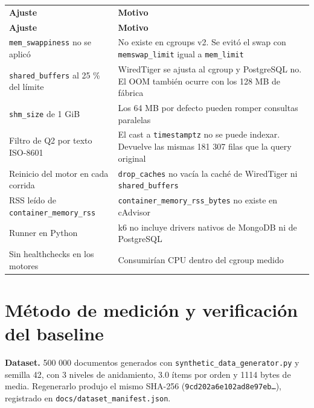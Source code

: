 \documentclass[11pt,letterpaper]{article}
\newcommand{\code}[1]{\texttt{#1}}
\begin{document}
{\footnotesize\setlength{\tabcolsep}{3pt}
\begin{longtable}{>{\raggedright\arraybackslash}p{}>{\raggedright\arraybackslash}p{}}
\multicolumn{2}{@{}l}{\normalsize \textbf{Ajustes respecto al playbook:}} \\[0.4em]
\toprule
\textbf{Ajuste} & \textbf{Motivo} \\
\midrule
\endfirsthead
\toprule
\textbf{Ajuste} & \textbf{Motivo} \\
\midrule
\endhead
\code{mem\_\allowbreak{}swappiness} no se aplicó & No existe en cgroups v2. Se evitó el swap con \code{memswap\_\allowbreak{}limit} igual a \code{mem\_\allowbreak{}limit} \\
\code{shared\_\allowbreak{}buffers} al 25 \% del límite & WiredTiger se ajusta al cgroup y PostgreSQL no. El OOM también ocurre con los 128 MB de fábrica \\
\code{shm\_\allowbreak{}size} de 1 GiB & Los 64 MB por defecto pueden romper consultas paralelas \\
Filtro de Q2 por texto ISO-8601 & El cast a \code{timestamptz} no se puede indexar. Devuelve las mismas 181 307 filas que la query original \\
Reinicio del motor en cada corrida & \code{drop\_\allowbreak{}caches} no vacía la caché de WiredTiger ni \code{shared\_\allowbreak{}buffers} \\
RSS leído de \code{container\_\allowbreak{}memory\_\allowbreak{}rss} & \code{container\_\allowbreak{}memory\_\allowbreak{}rss\_\allowbreak{}bytes} no existe en cAdvisor \\
Runner en Python & k6 no incluye drivers nativos de MongoDB ni de PostgreSQL \\
Sin healthchecks en los motores & Consumirían CPU dentro del cgroup medido \\
\bottomrule
\end{longtable}}

\section{Método de medición y verificación del baseline}

\textbf{Dataset.} 500 000 documentos generados con \code{synthetic\_\allowbreak{}data\_\allowbreak{}generator.\allowbreak{}py} y semilla 42, con 3 niveles de anidamiento, 3.0 ítems por orden y 1114 bytes de media. Regenerarlo produjo el mismo SHA-256 (\code{9cd202a6e102ad8e97eb…}), registrado en \code{docs/\allowbreak{}dataset\_\allowbreak{}manifest.\allowbreak{}json}.
\end{document}
